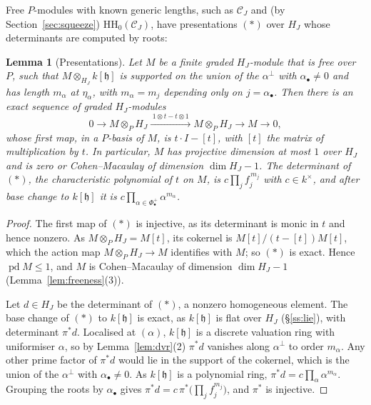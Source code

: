 \documentclass[11pt]{amsart}
\numberwithin{table}{section}
\numberwithin{figure}{section}
\numberwithin{equation}{section}
\newtheorem{lem}[thm]{Lemma}
\theoremstyle{definition}
\theoremstyle{plain}
\newcommand{\cC}{\mathcal{C}}
\newcommand{\h}{\mathfrak{h}}
\newcommand{\bul}{\bullet}
\newcommand{\HH}{\mathrm{HH}}
\DeclareMathOperator{\pd}{pd}
\begin{document}
Free $P$-modules with known generic lengths, such as $\cC_J$ and (by Section~\ref{sec:squeeze}) $\HH_0(\cC_J)$, have presentations $(\ast)$ over $H_J$ whose determinants are computed by roots:

\begin{lem}[Presentations]\label{lem:presentation}
Let $M$ be a finite graded $H_J$-module that is free over $P$, such that $M \otimes_{H_J} k[\h]$ is supported on the union of the $\alpha^\perp$ with $\alpha_\bul \neq 0$ and has length $m_\alpha$ at $\eta_\alpha$, with $m_\alpha = m_j$ depending only on $j = \alpha_\bul$. Then there is an exact sequence of graded $H_J$-modules
\[
0 \to M \otimes_P H_J \xrightarrow{\;1 \otimes t - t \otimes 1\;} M \otimes_P H_J \to M \to 0, \tag{$\ast$}
\]
whose first map, in a $P$-basis of $M$, is $t\cdot I - [t]$, with $[t]$ the matrix of multiplication by $t$. In particular, $M$ has projective dimension at most $1$ over $H_J$ and is zero or Cohen--Macaulay of dimension $\dim H_J - 1$. The determinant of $(\ast)$, the characteristic polynomial of $t$ on $M$, is $c \prod_{j} f_j^{\,m_j}$ with $c \in k^\times$, and after base change to $k[\h]$ it is $c \prod_{\alpha \in \Phi^+_\bul} \alpha^{m_\alpha}$.
\end{lem}

\begin{proof}
The first map of $(\ast)$ is injective, as its determinant is monic in $t$ and hence nonzero. As $M \otimes_P H_J = M[t]$, its cokernel is $M[t]/(t - [t])M[t]$, which the action map $M \otimes_P H_J \to M$ identifies with $M$; so $(\ast)$ is exact. Hence $\pd M \le 1$, and $M$ is Cohen--Macaulay of dimension $\dim H_J - 1$ (Lemma~\ref{lem:freeness}(3)).

Let $d \in H_J$ be the determinant of $(\ast)$, a nonzero homogeneous element. The base change of $(\ast)$ to $k[\h]$ is exact, as $k[\h]$ is flat over $H_J$ (\S\ref{ss:lie}), with determinant $\pi^*d$. Localised at $(\alpha)$, $k[\h]$ is a discrete valuation ring with uniformiser $\alpha$, so by Lemma~\ref{lem:dvr}(2) $\pi^*d$ vanishes along $\alpha^\perp$ to order $m_\alpha$. Any other prime factor of $\pi^*d$ would lie in the support of the cokernel, which is the union of the $\alpha^\perp$ with $\alpha_\bul \neq 0$. As $k[\h]$ is a polynomial ring, $\pi^*d = c\prod_{\alpha}\alpha^{m_\alpha}$. Grouping the roots by $\alpha_\bul$ gives $\pi^*d = c\,\pi^*\big(\prod_j f_j^{m_j}\big)$, and $\pi^*$ is injective.
\end{proof}
\end{document}

